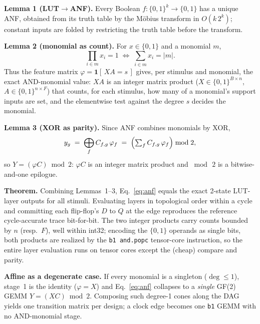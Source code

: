 \documentclass[sigconf]{acmart}
\newcommand{\mmapopc}{\texttt{and.popc}}
\begin{document}
\textbf{Lemma 1 (LUT$\rightarrow$ANF).} Every Boolean $f:\{0,1\}^k\!\to\!\{0,1\}$ has a unique
ANF, obtained from its truth table by the M\"obius transform in $O(k\,2^k)$; constant inputs are
folded by restricting the truth table before the transform.

\textbf{Lemma 2 (monomial as count).} For $x\in\{0,1\}$ and a monomial $m$,
\begin{equation}
\prod_{i\in m} x_i = 1 \;\Longleftrightarrow\; \sum_{i\in m} x_i = |m| .
\label{eq:count}
\end{equation}
Thus the feature matrix $\varphi=\mathbf{1}[\,XA=s\,]$ gives, per stimulus and monomial, the exact
AND-monomial value: $XA$ is an integer matrix product ($X\!\in\!\{0,1\}^{B\times n}$,
$A\!\in\!\{0,1\}^{n\times F}$) that counts, for each stimulus, how many of a monomial's support
inputs are set, and the elementwise test against the degree $s$ decides the monomial.

\textbf{Lemma 3 (XOR as parity).} Since ANF combines monomials by XOR,
\begin{equation}
y_g \;=\; \bigoplus_{f} C_{f,g}\,\varphi_f \;=\; \Bigl(\textstyle\sum_{f} C_{f,g}\,\varphi_f\Bigr)
\bmod 2 ,
\label{eq:parity}
\end{equation}
so $Y=(\varphi C)\bmod 2$: $\varphi C$ is an integer matrix product and $\bmod\,2$ is a
bitwise-and-one epilogue.

\textbf{Theorem.} Combining Lemmas~1--3, Eq.~\eqref{eq:anf} equals the exact 2-state LUT-layer
outputs for all stimuli. Evaluating layers in topological order within a cycle and committing
each flip-flop's $D$ to $Q$ at the edge reproduces the reference cycle-accurate trace
bit-for-bit. The two integer products carry counts bounded by $n$ (resp.\ $F$), well within
int32; encoding the $\{0,1\}$ operands as single bits, both products are realized by the
\texttt{b1 \mmapopc} tensor-core instruction, so the entire layer evaluation runs on tensor
cores except the (cheap) compare and parity.

\textbf{Affine as a degenerate case.} If every monomial is a singleton ($\deg\le 1$), stage~1 is
the identity ($\varphi=X$) and Eq.~\eqref{eq:anf} collapses to a \emph{single} GF(2) GEMM
$Y=(XC)\bmod2$. Composing such degree-1 cones along the DAG yields one transition matrix per
design; a clock edge becomes one \texttt{b1} GEMM with no AND-monomial stage.
\end{document}
